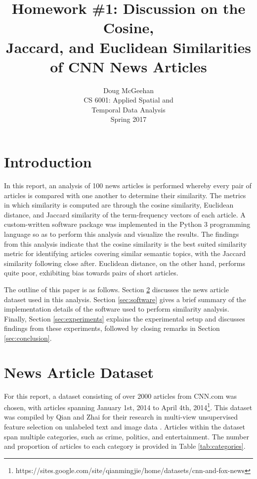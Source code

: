 \documentclass[11pt]{article}
\title{Homework \#1: Discussion on the Cosine, \\ Jaccard, and Euclidean Similarities\\ of CNN News Articles}
\author{Doug McGeehan\\
		CS 6001: Applied Spatial and \\ Temporal Data Analysis\\
		Spring 2017}
\begin{document}
\maketitle

\section{Introduction}

In this report, an analysis of 100 news articles is performed whereby every pair of articles is compared with one another to determine their similarity.
The metrics in which similarity is computed are through the cosine similarity, Euclidean distance, and Jaccard similarity of the term-frequency vectors of each article.
A custom-written software package was implemented in the Python 3 programming language so as to perform this analysis and visualize the results.
The findings from this analysis indicate that the cosine similarity is the best suited similarity metric for identifying articles covering similar semantic topics, with the Jaccard similarity following close after.
Euclidean distance, on the other hand, performs quite poor, exhibiting bias towards pairs of short articles.

The outline of this paper is as follows.
Section \ref{sec:dataset} discusses the news article dataset used in this analysis.
Section \ref{sec:software} gives a brief summary of the implementation details of the software used to perform similarity analysis.
Finally, Section \ref{sec:experiments} explains the experimental setup and discusses findings from these experiments, followed by closing remarks in Section \ref{sec:conclusion}.


\section{News Article Dataset} \label{sec:dataset}

For this report, a dataset consisting of over 2000 articles from CNN.com was chosen, with articles spanning January 1st, 2014 to April 4th, 2014\footnote{
https://sites.google.com/site/qianmingjie/home/datasets/cnn-and-fox-news
}.
This dataset was compiled by Qian and Zhai for their research in multi-view unsupervised feature selection on unlabeled text and image data \cite{qian2014unsupervised}.
Articles within the dataset span multiple categories, such as crime, politics, and entertainment.
The number and proportion of articles to each category is provided in Table \ref{tab:categories}.
\end{document}
